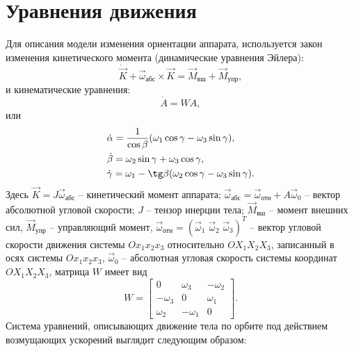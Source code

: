 \section{Уравнения движения}
\noindent\indent Для описания модели изменения ориентации аппарата, используется
закон изменения кинетического момента (динамические уравнения Эйлера):
\begin{equation}\label{eq:EulerDynamic}
    \dot{\vec{K}} + \vec{\omega}_{\text{абс}} \times \vec{K} = \vec{M}_{\text{вш}} + \vec{M}_{\text{упр}},
\end{equation}
и кинематические уравнения:
\begin{equation}\label{eq:EulerKinematic}
    \dot{A} = WA,
\end{equation}
или
\begin{equation}
    \begin{aligned}
        & \dot{\alpha} = \frac{1}{\cos\beta}(\omega_1\cos\gamma - \omega_3\sin\gamma), \\
        & \dot{\beta} = \omega_2\sin\gamma + \omega_3\cos\gamma, \\
        & \dot{\gamma} = \omega_1 - \tg\beta(\omega_2\cos\gamma - \omega_3\sin\gamma).
    \end{aligned}
\end{equation}
Здесь $\vec{K} = J\vec{\omega}_{\text{абс}}$ -- кинетический момент аппарата;
$\vec{\omega}_{\text{абс}} = \vec{\omega}_{\text{отн}} + A\vec{\omega}_0$ -- вектор
абсолютной угловой скорости; $J$ -- тензор инерции тела; $\vec{M}_{\text{вш}}$ --
момент внешних сил, $\vec{M}_{\text{упр}}$ -- управляющий момент,
$\vec{\omega}_{\text{отн}} = (\vec{\omega}_1\,\, \vec{\omega}_2\,\, \vec{\omega}_3)^T$ --
вектор угловой скорости движения системы $Ox_1x_2x_3$ относительно $OX_1X_2X_3$,
записанный в осях системы $Ox_1x_2x_3$, $\vec{\omega}_0$ -- абсолютная угловая
скорость системы координат $OX_1X_2X_3$, матрица $W$ имеет вид
\begin{equation}
    W = \begin{bmatrix}
        0 & \omega_3 & -\omega_2 \\
        -\omega_3 & 0 & \omega_1 \\
        \omega_2 & -\omega_1 & 0
    \end{bmatrix}.
\end{equation}
\noindent\indent Система уравнений, описывающих движение тела по орбите
под действием возмущающих ускорений выглядит следующим образом:
